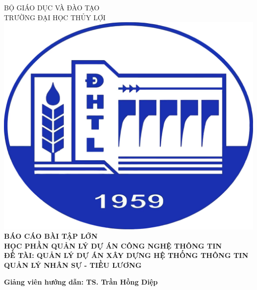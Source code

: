 \begin{titlepage}

\begin{center}
    {\Large BỘ GIÁO DỤC VÀ ĐÀO TẠO}\\
    {\Large TRƯỜNG ĐẠI HỌC THỦY LỢI}\\[1cm]

    \includegraphics[scale=0.15]{images/Logo-DH-Thuy-Loi.png}\\[1.5cm]

    {\Large \bfseries BÁO CÁO BÀI TẬP LỚN} \\[1cm] 
    {\Large \bfseries HỌC PHẦN QUẢN LÝ DỰ ÁN CÔNG NGHỆ THÔNG TIN} \\[1cm] 
    {\Large \bfseries ĐỀ TÀI: QUẢN LÝ DỰ ÁN XÂY DỰNG HỆ THỐNG THÔNG TIN QUẢN LÝ NHÂN SỰ - TIỀU LƯƠNG} \\[1cm] 

\end{center}

\vspace{-1.5cm} %

\begin{flushleft}
    \textbf{Giảng viên hướng dẫn: TS. Trần Hồng Diệp}
\end{flushleft}


\end{titlepage}
